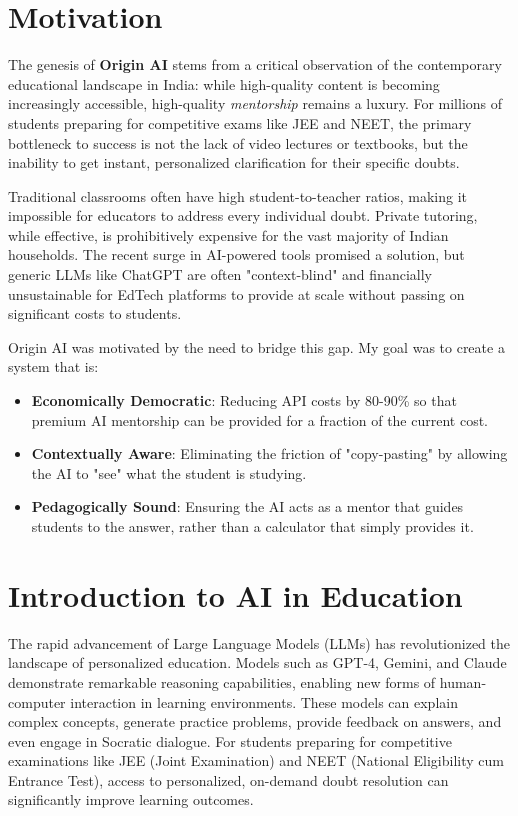 \section{Motivation}

The genesis of \textbf{Origin AI} stems from a critical observation of the contemporary educational landscape in India: while high-quality content is becoming increasingly accessible, high-quality \textit{mentorship} remains a luxury. For millions of students preparing for competitive exams like JEE and NEET, the primary bottleneck to success is not the lack of video lectures or textbooks, but the inability to get instant, personalized clarification for their specific doubts.

Traditional classrooms often have high student-to-teacher ratios, making it impossible for educators to address every individual doubt. Private tutoring, while effective, is prohibitively expensive for the vast majority of Indian households. The recent surge in AI-powered tools promised a solution, but generic LLMs like ChatGPT are often "context-blind" and financially unsustainable for EdTech platforms to provide at scale without passing on significant costs to students.

Origin AI was motivated by the need to bridge this gap. My goal was to create a system that is:
\begin{itemize}
    \item \textbf{Economically Democratic}: Reducing API costs by 80-90\% so that premium AI mentorship can be provided for a fraction of the current cost.
    \item \textbf{Contextually Aware}: Eliminating the friction of "copy-pasting" by allowing the AI to "see" what the student is studying.
    \item \textbf{Pedagogically Sound}: Ensuring the AI acts as a mentor that guides students to the answer, rather than a calculator that simply provides it.
\end{itemize}

\section{Introduction to AI in Education}

The rapid advancement of Large Language Models (LLMs) has revolutionized the landscape of personalized education. Models such as GPT-4, Gemini, and Claude demonstrate remarkable reasoning capabilities, enabling new forms of human-computer interaction in learning environments. These models can explain complex concepts, generate practice problems, provide feedback on answers, and even engage in Socratic dialogue. For students preparing for competitive examinations like JEE (Joint Examination) and NEET (National Eligibility cum Entrance Test), access to personalized, on-demand doubt resolution can significantly improve learning outcomes.

